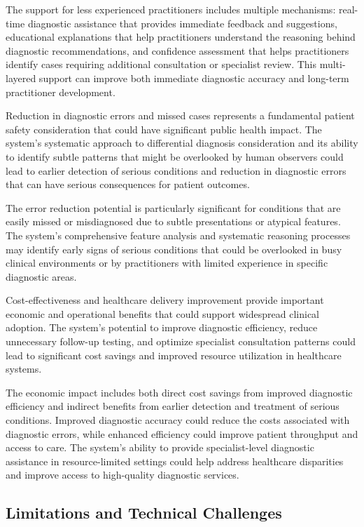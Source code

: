 The support for less experienced practitioners includes multiple mechanisms: real-time diagnostic assistance that provides immediate feedback and suggestions, educational explanations that help practitioners understand the reasoning behind diagnostic recommendations, and confidence assessment that helps practitioners identify cases requiring additional consultation or specialist review. This multi-layered support can improve both immediate diagnostic accuracy and long-term practitioner development.

Reduction in diagnostic errors and missed cases represents a fundamental patient safety consideration that could have significant public health impact. The system's systematic approach to differential diagnosis consideration and its ability to identify subtle patterns that might be overlooked by human observers could lead to earlier detection of serious conditions and reduction in diagnostic errors that can have serious consequences for patient outcomes.

The error reduction potential is particularly significant for conditions that are easily missed or misdiagnosed due to subtle presentations or atypical features. The system's comprehensive feature analysis and systematic reasoning processes may identify early signs of serious conditions that could be overlooked in busy clinical environments or by practitioners with limited experience in specific diagnostic areas.

Cost-effectiveness and healthcare delivery improvement provide important economic and operational benefits that could support widespread clinical adoption. The system's potential to improve diagnostic efficiency, reduce unnecessary follow-up testing, and optimize specialist consultation patterns could lead to significant cost savings and improved resource utilization in healthcare systems.

The economic impact includes both direct cost savings from improved diagnostic efficiency and indirect benefits from earlier detection and treatment of serious conditions. Improved diagnostic accuracy could reduce the costs associated with diagnostic errors, while enhanced efficiency could improve patient throughput and access to care. The system's ability to provide specialist-level diagnostic assistance in resource-limited settings could help address healthcare disparities and improve access to high-quality diagnostic services.

\subsection{Limitations and Technical Challenges}


